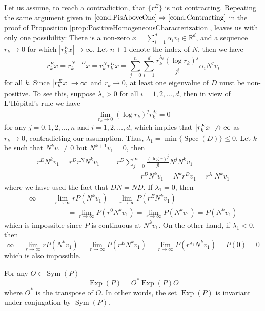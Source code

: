 \documentclass[smallextended]{svjour3}
\theoremstyle{remark}
\renewenvironment{proof}[1][\proofname]{\renewcommand\xproofname{#1}\xproof}{\endxproof}
\newcommand\Sym{\operatorname{Sym}}
\newcommand\Exp{\operatorname{Exp}}
\newcommand\Spec{\operatorname{Spec}}
\newcommand{\f}[2]{\frac{#1}{#2}}
\begin{document}
\begin{proof}
Let us assume, to reach a contradiction, 
that $\{ r^E \}$ is not contracting. Repeating the same argument given in $\ref{cond:PisAboveOne}\Rightarrow\ref{cond:Contracting}$ in the proof of Proposition \ref{prop:PositiveHomogeneousCharacterization}, leaves us with only one possibility: There is a non-zero $x = \sum^d_{i=1}\alpha_i v_i \in\mathbb{R}^d$, and a sequence $r_k\to 0$ for which $|r_k^E x|\to\infty$. Let $n+1$ denote the index of $N$, then we have
\begin{equation*}
r^E_k x = r_k^{N+D} x 
= r_k^N r_k^D x 
= \sum_{j=0}^n\sum_{i=1}^d \f{r_k^{\lambda_i}(\log r_k)^j}{j!}   \alpha_iN^j v_i
\end{equation*}
for all $k$. Since $\abs{r_k^E x} \to \infty$ and $r_k \to 0$, at least one eigenvalue of $D$ must be non-positive. To see this, suppose $\lambda_i > 0$ for all $i = 1,2,\dots,d$, then in view of L'H\^{o}pital's rule we have
\begin{equation*}
    \lim_{r_k \to 0}(\log r_k)^j r_k^{\lambda_i} = 0  
\end{equation*}
for any $j =0, 1,2,\dots,n$ and $i =1,2,\dots,d$, which implies that $\abs{r^E_k x} \not\to \infty$ as $r_k \to 0$, contradicting our assumption. Thus, $\lambda_1 = \min\{ \Spec(D)\} \leq 0$. Let $k$ be such that $N^k v_1 \neq 0$ but $N^{k+1} v_1 = 0$, then
\begin{eqnarray*}
    r^E N^k v_1 = r^D r^N N^k v_1 &=& r^D \sum_{j=0}^\infty \f{(\log r)^j}{j!}N^j N^k v_1 \\
    &&\qquad= r^D N^k v_1 = N^k r^D  v_1 =  r^{\lambda_{1}} N^k  v_1
\end{eqnarray*}
where we have used the fact that $DN = ND$. If $\lambda_1= 0$, then 
\begin{eqnarray*}
    \infty &=&  \lim_{r\to \infty} rP(N^k v_1)  = \lim_{r\to \infty} P( r^E N^k v_1) \\
    && \qquad =\lim_{r\to \infty}P(r^{0} N^k v_1)= \lim_{r\to \infty}P( N^k v_1) = P(N^k v_1)
\end{eqnarray*}
which is impossible since $P$ is continuous at $N^k v_1$. On the other hand, if $\lambda_1 < 0$, then
\begin{equation*}
    \infty = \lim_{r\to \infty} rP(N^k v_1) = \lim_{r\to \infty} P(r^E N^k v_1) = \lim_{r\to \infty}P(r^{\lambda_1} N^k v_1) = P(0) = 0
\end{equation*}
which is also impossible. 
\end{proof}

\begin{proposition}\label{prop:ExpP}
For any  $O \in \Sym{(P)} $
\begin{equation*}
    \Exp(P) = O^* \Exp(P) O
\end{equation*}
where $O^*$ is the transpose of $O$. In other words, the set $\Exp(P)$ is invariant under conjugation by $\Sym(P)$.
\end{proposition}
\end{document}
